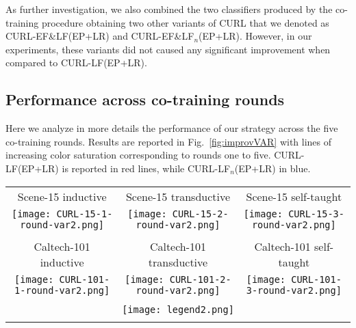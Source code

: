 \documentclass[journal,11pt]{IEEEtran}
\newcommand{\ADD}[1]{#1}
\newcommand{\coso}{strategy}
\newcommand{\curllf}{CURL-LF(EP+LR)}
\newcommand{\curllfn}{CURL-LF$_n$(EP+LR)}
\newcommand{\curleflf}{CURL-EF\&LF(EP+LR)}
\newcommand{\curleflfn}{CURL-EF\&LF$_n$(EP+LR)}
\begin{document}
As further investigation, we also combined the two classifiers produced by the co-training procedure obtaining two other variants of CURL that we denoted as \curleflf{ }and \curleflfn.
However, in our experiments, these variants did not caused any significant
improvement when compared to \curllf.   



\subsection{Performance across co-training rounds}
\label{subsec:rounds}
Here we analyze \ADD{in more details} the performance of our \coso{ }across the five 
co-training rounds. Results are reported in Fig.~\ref{fig:improvVAR} with lines of increasing color saturation corresponding to rounds one to five. \curllf{ }is reported in red lines, while \curllfn{ }in blue. 
%
\begin{figure*}[!htbp]%
\centering
\renewcommand{\tabcolsep}{0cm}
\scriptsize
\begin{tabular}{ccc}
Scene-15 inductive & Scene-15 transductive & Scene-15 self-taught\\ 
\texttt{[image: CURL-15-1-round-var2.png]} &
\texttt{[image: CURL-15-2-round-var2.png]} &
\texttt{[image: CURL-15-3-round-var2.png]} \\
\\
Caltech-101 inductive & Caltech-101 transductive & Caltech-101 self-taught\\ 
\texttt{[image: CURL-101-1-round-var2.png]} &
\texttt{[image: CURL-101-2-round-var2.png]} &
\texttt{[image: CURL-101-3-round-var2.png]} \\
\\
\multicolumn{3}{c}{\texttt{[image: legend2.png]}} \\
\\
\end{tabular}
\caption{Performance obtained by \curllf{ }and \curllfn{ }varying the
  number of co-training rounds.  %
  Performance are reported in terms of MAP improvement
  with respect to Ensemble Projection.  Due to the small cardinality
  of some classes, inductive learning on the Caltech-101 has been
  limited to five labeled images per class.}
\label{fig:improvVAR}
\end{figure*}
\end{document}
